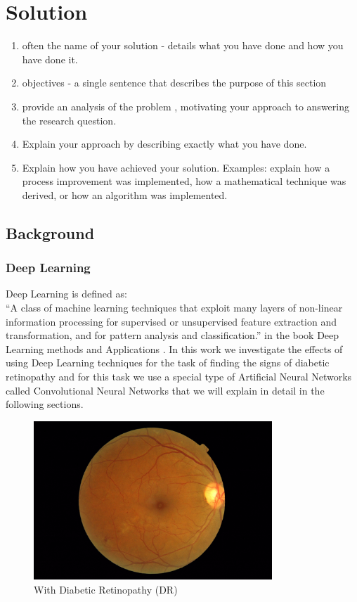 \chapter{Solution}
\begin{enumerate}
    \item often the name of your solution - details what you have done and how you have done it.
    \item objectives - a single sentence that describes the purpose of this section
    \item provide an analysis of the problem , motivating your approach to answering the research question.
    \item Explain your approach by describing exactly what you have done.
    \item Explain how you have achieved your solution. Examples: explain how a process improvement was implemented, how a mathematical technique was derived, or how an algorithm was implemented.
\end{enumerate}

\section{Background}
\subsection{Deep Learning}
Deep Learning is defined as:\\
``A class of machine learning techniques that exploit many layers of non-linear information processing for supervised or unsupervised feature extraction and transformation, and for pattern analysis and classification.'' in the book Deep Learning methods and Applications \citep{deng2014deep}. In this work we investigate the effects of using Deep Learning techniques for the task of finding the signs of diabetic retinopathy and for this task we use a special type of Artificial Neural Networks called Convolutional Neural Networks that we will explain in detail in the following sections.   

\begin{figure}[t]
\centering
\includegraphics[width=0.8\textwidth]{Figures/DR}
\caption{With Diabetic Retinopathy (DR)}
\label{figDR}
\end{figure}

